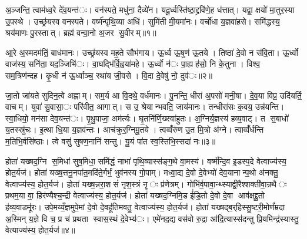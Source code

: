 


अ॒ञ्जन्ति॒ त्वाम॑ध्व॒रे दे॑व॒यन्त॑ः। वन॑स्पते॒ मधु॑ना॒ दैव्ये॑न। यदू॒र्ध्वस्ति॑ष्ठा॒द्द्रवि॑णे॒ह ध॑त्तात्। यद्वा॒ क्षयो॑ मा॒तुर॒स्या उ॒पस्थे। उच्छ्र॑यस्व वनस्पते। वर्ष्म॑न्पृथि॒व्या अधि॑। सुमि॑ती मी॒यमा॑नः। वर्चो॑धा य॒ज्ञवा॑हसे। समि॑द्धस्य॒ श्रय॑माणः पु॒रस्तात्। ब्रह्म॑ वन्वा॒नो अ॒जर सु॒वीरम्॥१॥

आ॒रे अ॒स्मदम॑तिं॒ बाध॑मानः। उच्छ्र॑यस्व मह॒ते सौभ॑गाय। ऊ॒र्ध्व ऊ॒षुण॑ ऊ॒तये। तिष्ठा॑ दे॒वो न स॑वि॒ता। ऊ॒र्ध्वो वाज॑स्य॒ सनि॑ता॒ यद॒ञ्जिभि॑ः। वा॒घद्भि॑र्वि॒ह्वया॑महे। ऊ॒र्ध्वो न॑ः पा॒ह्यह॑सो॒ नि के॒तुना। विश्व॒ सम॒त्रिण॑न्दह। कृ॒धी न॑ ऊ॒र्ध्वाञ्च॒ रथा॑य जी॒वसे। वि॒दा दे॒वेषु॑ नो॒ दुव॑ः॥२॥

जा॒तो जा॑यते सुदिन॒त्वे अह्नाम्। सम॒र्य आ वि॒दथे॒ वर्ध॑मानः। पु॒नन्ति॒ धीरा॑ अ॒पसो॑ मनी॒षा। दे॒व॒या विप्र॒ उदि॑यर्ति॒ वाचम्। युवा॑ सु॒वासा॒ः परि॑वीत॒ आगात्। स उ॒ श्रेयान्भवति॒ जाय॑मानः। तन्धीरा॑सः क॒वय॒ उन्न॑यन्ति। स्वा॒धियो॒ मन॑सा देव॒यन्त॑ः। पृ॒थु॒पाजा॒ अम॑र्त्यः। घृ॒तनि॑र्णि॒ख्स्वा॑हुतः। अ॒ग्निर्य॒ज्ञस्य॑ हव्य॒वाट्। त स॒बाधो॑ य॒तस्स्रु॑चः। इ॒त्था धि॒या य॒ज्ञव॑न्तः। आच॑क्रुर॒ग्निमू॒तये। त्वव्वँरु॑ण उ॒त मि॒त्रो अ॑ग्ने। त्वाव्वँ॑र्धन्ति म॒तिभि॒र्वसि॑ष्ठाः। त्वे वसु॑ सुषण॒नानि॑ सन्तु। यू॒यं पा॑त स्व॒स्तिभि॒स्सदा॑ नः॥३॥


होता॑ यख्षद॒ग्नि स॒मिधा॑ सुष॒मिधा॒ समि॑द्धं॒ नाभा॑ पृथि॒व्यास्स॑ङ्ग॒थे वा॒मस्य॑। वर्ष्म॑न्दि॒व इ॒डस्प॒दे वेत्वाज्य॑स्य॒ होत॒र्यज॑। होता॑ यख्ष॒त्तनू॒नपा॑त॒मदि॑ते॒र्गर्भं॒ भुव॑नस्य गो॒पाम्। मध्वा॒द्य दे॒वो दे॒वेभ्यो॑ देव॒यानान्प॒थो अ॑नक्तु॒ वेत्वाज्य॑स्य॒ होत॒र्यज॑। होता॑ यख्ष॒न्नरा॒शसं॑ नृश॒स्त्रं नॄः प्र॑णेत्रम्। गोभि॑र्व॒पावा॒न्थ्स्याद्वी॒रैश्शक्ती॑वा॒न्रथैः प्रथम॒या वा॒ हिर॑ण्यैश्च॒न्द्री वेत्वाज्य॑स्य॒ होत॒र्यज॑। होता॑ यख्षद॒ग्निमि॒ड ई॑डि॒तो दे॒वो दे॒वा आव॑क्षद्दू॒तो ह॑व्य॒वाडमू॑रः। उपे॒मय्यँ॒ज्ञमुपे॒मां दे॒वो दे॒वहू॑तिमवतु॒ वेत्वाज्य॑स्य॒ होत॒र्यज॑। होता॑ यख्षद्ब॒र्‌हिस्सु॒ष्टरी॒मोर्णं॑म्रदा अ॒स्मिन् य॒ज्ञे वि च॒ प्र च॑ प्रथता स्वास॒स्थं दे॒वेभ्य॑ः। एमे॑नद॒द्य वस॑वो रु॒द्रा आ॑दि॒त्यास्स॑दन्तु प्रि॒यमिन्द्र॑स्यास्तु॒ वेत्याज्य॑स्य॒ होत॒र्यज॑॥४॥


